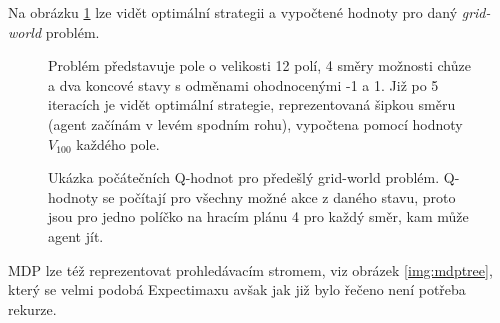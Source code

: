 Na obrázku \ref{img:policy} lze vidět optimální strategii a vypočtené hodnoty pro daný \textit{grid-world} problém.

\begin{figure}[!htbp]
\begin{center}
	\caption{Problém představuje pole o velikosti 12 polí, 4 směry možnosti chůze a dva koncové stavy s odměnami ohodnocenými -1 a 1. Již po 5 iteracích je vidět optimální strategie, reprezentovaná šipkou směru (agent začínám v levém spodním rohu), vypočtena pomocí hodnoty $V_{100}$ každého pole.}
	\label{img:policy}
\end{center}
\end{figure}

\begin{figure}[!htbp]
\begin{center}
	\caption{Ukázka počátečních Q-hodnot pro předešlý grid-world problém. Q-hodnoty se počítají pro všechny možné akce z daného stavu, proto jsou pro jedno políčko na hracím plánu 4 pro každý směr, kam může agent jít.}
	\label{img:qvals}
\end{center}
\end{figure}
MDP lze též reprezentovat prohledávacím stromem, viz obrázek \ref{img:mdptree}, který se velmi podobá Expectimaxu avšak jak již bylo řečeno není potřeba rekurze.

